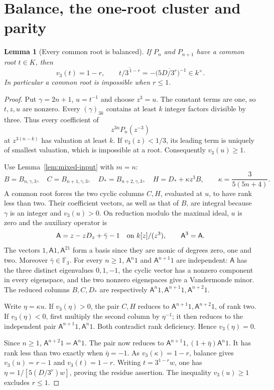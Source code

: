 \documentclass[11pt]{article}
\newtheorem{lemma}{Lemma}
\begin{document}
\section{Balance, the one-root cluster and parity}
\begin{lemma}[Every common root is balanced]\label{lem:balance}
If $P_n$ and $P_{n+1}$ have a common root $t\in K$, then
\[
 v_3(t)=1-r,\qquad
 \overline{t/3^{\,1-r}}=-\bigl(5\overline{D/3^r}\bigr)^{-1}\in k^\times.
\]
In particular a common root is impossible when $r\le1$.
\end{lemma}
\begin{proof}
Put $\gamma=2n+1$, $u=t^{-1}$ and choose $z^3=u$.
The constant terms are one, so $t,z,u$ are nonzero.
Every $(\gamma)_{3k}$ contains at least $k$ integer factors divisible
by three. Thus every coefficient of
\[
 z^{3n}P_n(z^{-3})
\]
at $z^{3(n-k)}$ has valuation at least $k$.
If $v_3(z)<1/3$, its leading term is uniquely of smallest valuation,
which is impossible at a root. Consequently $v_3(u)\ge1$.

Use Lemma~\ref{lem:mixed-input} with $m=n$:
\[
 B=B_{n,\gamma,3},\quad C=B_{n+1,\gamma,3},\quad
 D_*=B_{n+2,\gamma,3},\quad
 H=D_*+\kappa z^3B,\qquad
 \kappa=\frac3{5(5n+4)}.
\]
A common root forces the two cyclic columns $C,H$, evaluated at $u$,
to have rank less than two. Their coefficient vectors, as well as
that of $B$, are integral because $\gamma$ is an integer and
$v_3(u)>0$.
On reduction modulo the maximal ideal, $u$ is zero and the auxiliary
operator is
\[
 \mathsf A=z-zD_z+\bar\gamma-1
 \quad\hbox{on }k[z]/(z^3),\qquad \mathsf A^3=\mathsf A.
\]
The vectors $1,\mathsf A1,\mathsf A^21$ form a basis since they are
monic of degrees zero, one and two. Moreover $\bar\gamma\in\mathbb F_3$.
For every $n\ge1$, $\mathsf A^n1$ and $\mathsf A^{n+1}1$
are independent: $\mathsf A$ has the three distinct eigenvalues
$0,1,-1$, the cyclic vector has a nonzero component in every
eigenspace, and the two nonzero eigenspaces give a Vandermonde minor.
The reduced columns $B,C,D_*$ are respectively
$\mathsf A^n1,\mathsf A^{n+1}1,\mathsf A^{n+2}1$.

Write $\eta=\kappa u$. If $v_3(\eta)>0$, the pair $C,H$ reduces
to $\mathsf A^{n+1}1,\mathsf A^{n+2}1$, of rank two.
If $v_3(\eta)<0$, first multiply the second column by $\eta^{-1}$;
it then reduces to the independent pair
$\mathsf A^{n+1}1,\mathsf A^n1$.
Both contradict rank deficiency. Hence $v_3(\eta)=0$.

Since $n\ge1$, $\mathsf A^{n+2}1=\mathsf A^n1$.
The pair now reduces to
$\mathsf A^{n+1}1,(1+\bar\eta)\mathsf A^n1$.
It has rank less than two exactly when $\bar\eta=-1$.
As $v_3(\kappa)=1-r$, balance gives $v_3(u)=r-1$
and $v_3(t)=1-r$.
Writing $t=3^{1-r}w$, one has
$\eta=1/[5(D/3^r)w]$, proving the residue assertion.
The inequality $v_3(u)\ge1$ excludes $r\le1$.
\end{proof}
\end{document}
